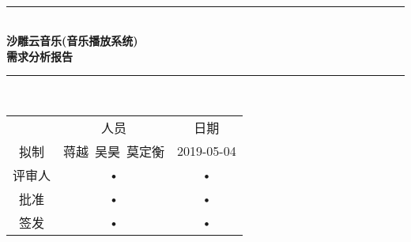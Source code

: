 \documentclass[bachelor]{ustcthesis}
\newcommand{\proname}{沙雕云音乐}
\newcommand{\docname}{\proname (音乐播放系统)}
\newcommand{\HRule}{\rule{\linewidth}{0.5mm}}
\begin{document}
\begin{titlepage}
\begin{center}
~\\[5cm]
\HRule \\[0.4cm]
{\huge \bfseries \docname\\需求分析报告}\\[0.4cm]
\HRule \\[1.5cm]

\begin{tabular}{ccc}
  & 人员 & 日期 \\ 
拟制 & 蒋越\ 吴昊\ 莫定衡 & 2019-05-04 \\ 
评审人 & • & • \\ 
批准 & • & • \\ 
签发 & • & • \\ 
\end{tabular} 

\end{center}
\end{titlepage}



\frontmatter

\tableofcontents
\listoffigures
\listoftables
% 

\mainmatter












\appendix


\end{document}
